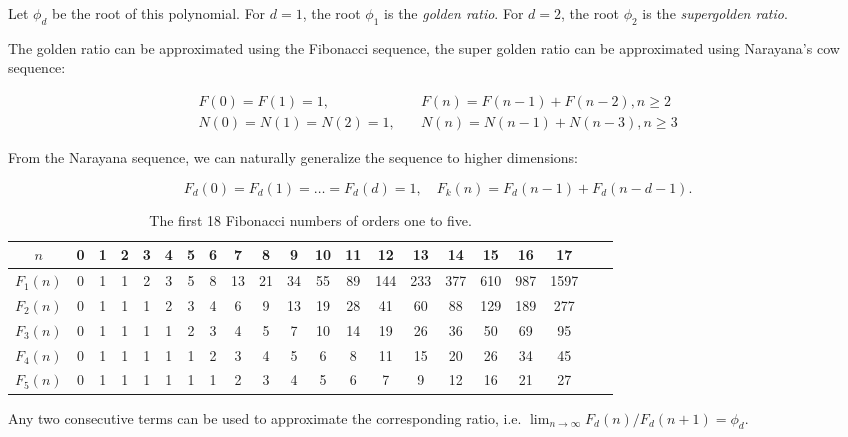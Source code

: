 \documentclass[english,version-2020-11]{uzl-thesis}
\begin{document}
Let $\phi_d$ be the root of this polynomial.
For $d = 1$, the root $\phi_1$ is the \emph{golden ratio}.
For $d = 2$, the root $\phi_2$ is the \emph{supergolden ratio}.

The golden ratio can be approximated using the Fibonacci sequence,
the super golden ratio can be approximated using Narayana's cow sequence:

\begin{align*}
  F(0) = F(1) = 1,        & \quad F(n) = F(n - 1) + F(n - 2), n \ge 2 \\
  N(0) = N(1) = N(2) = 1, & \quad N(n) = N(n - 1) + N(n - 3), n \ge 3
\end{align*}

From the Narayana sequence, we can naturally generalize the sequence to higher dimensions:

\[
  F_d(0) = F_d(1) = \dots = F_d(d) = 1, \quad F_k(n) = F_d(n - 1) + F_d(n - d - 1).
\]

\begin{table}[t]
  \caption{The first 18 Fibonacci numbers of orders one to five.}
  \begin{tabular}{c|cccccccccccccccccccc}
    $n$     & 0 & 1 & 2 & 3 & 4 & 5 & 6 & 7  & 8  & 9  & 10 & 11 & 12  & 13  & 14  & 15  & 16  & 17   \\ %
    \hline
    $F_1(n)$ & 0 & 1 & 1 & 2 & 3 & 5 & 8 & 13 & 21 & 34 & 55 & 89 & 144 & 233 & 377 & 610 & 987 & 1597 \\ %
    $F_2(n)$ & 0 & 1 & 1 & 1 & 2 & 3 & 4 & 6  & 9  & 13 & 19 & 28 & 41  & 60  & 88  & 129 & 189 & 277  \\ %
    $F_3(n)$ & 0 & 1 & 1 & 1 & 1 & 2 & 3 & 4  & 5  & 7  & 10 & 14 & 19  & 26  & 36  & 50  & 69  & 95   \\ %
    $F_4(n)$ & 0 & 1 & 1 & 1 & 1 & 1 & 2 & 3  & 4  & 5  & 6  & 8  & 11  & 15  & 20  & 26  & 34  & 45   \\ %
    $F_5(n)$ & 0 & 1 & 1 & 1 & 1 & 1 & 1 & 2  & 3  & 4  & 5  & 6  & 7   & 9   & 12  & 16  & 21  & 27   \\ %
  \end{tabular}
\end{table}

Any two consecutive terms can be used to approximate the corresponding ratio, i.e. $\lim_{n \to \infty} F_d(n) / F_d(n + 1) = \phi_d$.
\end{document}
